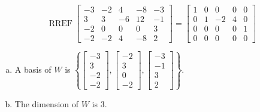 \begin{exerciseAnswer} 


\[\operatorname{RREF} \left[\begin{array}{ccccc}
-3 & -2 & 4 & -8 & -3 \\
3 & 3 & -6 & 12 & -1 \\
-2 & 0 & 0 & 0 & 3 \\
-2 & -2 & 4 & -8 & 2
\end{array}\right] = \left[\begin{array}{ccccc}
1 & 0 & 0 & 0 & 0 \\
0 & 1 & -2 & 4 & 0 \\
0 & 0 & 0 & 0 & 1 \\
0 & 0 & 0 & 0 & 0
\end{array}\right] \]


\begin{enumerate}[(a)]
\item A basis of \(W\) is \( \left\{ \left[\begin{array}{c}
-3 \\
3 \\
-2 \\
-2
\end{array}\right] , \left[\begin{array}{c}
-2 \\
3 \\
0 \\
-2
\end{array}\right] , \left[\begin{array}{c}
-3 \\
-1 \\
3 \\
2
\end{array}\right] \right\} \).
\item The dimension of \(W\) is \( 3 \).
\end{enumerate}
    
\end{exerciseAnswer}
    
